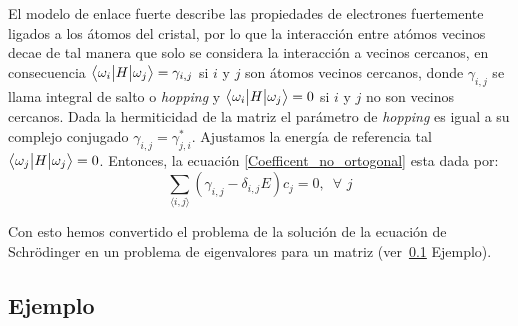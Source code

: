    El modelo de enlace fuerte describe las propiedades de electrones fuertemente ligados a los átomos del cristal, por lo que la interacción entre atómos vecinos decae de tal manera que solo se considera la interacción a vecinos cercanos, en consecuencia  $\big \langle{\omega_i}\big | {H} \big | {\omega_j} \big \rangle = \gamma_{i,j}$ si $i$ y $j$ son átomos vecinos cercanos, donde $\gamma_{i,j}$ se llama integral de salto o {\it hopping} y $\big \langle{\omega_i}\big | {H} \big | {\omega_j} \big \rangle = 0$ si $i$ y $j$ no son vecinos cercanos. Dada la hermiticidad de la matriz el parámetro de {\it hopping} es igual a su complejo conjugado $\gamma_{i,j} = \gamma^*_{j,i}$.
    Ajustamos la energía de referencia tal $\big \langle{\omega_j}\big | {H} \big | {\omega_j} \big \rangle = 0$. Entonces, la ecuación \eqref{Coefficent_no_ortogonal} esta dada por:
    \begin{equation}
        \sum_{\langle i, j \rangle } ( \gamma_{i,j} - \delta_{i,j}E )c_j = 0, \,\,\, \forall\,\, j
    \end{equation}
    
    
    
    
    Con esto hemos convertido el problema de la solución de la ecuación de Schrödinger en un problema de eigenvalores para un matriz (ver~\ref{SecEjemplo} Ejemplo).

    \subsection{Ejemplo}\label{SecEjemplo}
    
